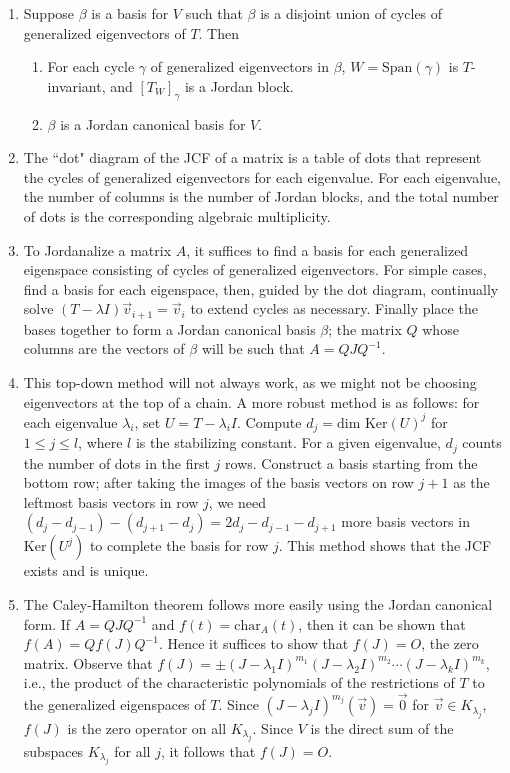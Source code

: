 \documentclass[10pt]{article}
\begin{document}
\begin{multicols*}{2}
\begin{enumerate}
\begin{enumerate}
        \item Suppose $\beta$ is a basis for $V$ such that $\beta$ is a disjoint union of cycles of generalized eigenvectors of $T$. Then
        \begin{enumerate}
            \item For each cycle $\gamma$ of generalized eigenvectors in $\beta$, $W=\text{Span}(\gamma)$ is $T$-invariant, and $[T_W]_\gamma$ is a Jordan block.
            \item $\beta$ is a Jordan canonical basis for $V$.
        \end{enumerate}
        \item The ``dot" diagram of the JCF of a matrix is a table of dots that represent the cycles of generalized eigenvectors for each eigenvalue. For each eigenvalue, the number of columns is the number of Jordan blocks, and the total number of dots is the corresponding algebraic multiplicity.
        \item To Jordanalize a matrix $A$, it suffices to find a basis for each generalized eigenspace consisting of cycles of generalized eigenvectors. For simple cases, find a basis for each eigenspace, then, guided by the dot diagram, continually solve $(T-\lambda I)\vec{v}_{i+1} = \vec{v}_i$ to extend cycles as necessary. Finally place the bases together to form a Jordan canonical basis $\beta$; the matrix $Q$ whose columns are the vectors of $\beta$ will be such that $A=QJQ^{-1}$. 
        \item This top-down method will not always work, as we might not be choosing eigenvectors at the top of a chain. A more robust method is as follows: for each eigenvalue $\lambda_i$, set $U=T-\lambda_i I$. Compute $d_j = \text{dim Ker}(U)^j$ for $1 \leq j \leq l$, where $l$ is the stabilizing constant. For a given eigenvalue, $d_j$ counts the number of dots in the first $j$ rows. Construct a basis starting from the bottom row; after taking the images of the basis vectors on row $j+1$ as the leftmost basis vectors in row $j$, we need $(d_j-d_{j-1}) - (d_{j+1}-d_{j}) = 2d_j-d_{j-1}-d_{j+1}$ more basis vectors in $\text{Ker}(U^j)$ to complete the basis for row $j$. This method shows that the JCF exists and is unique.
        \item The Caley-Hamilton theorem follows more easily using the Jordan canonical form. If $A=QJQ^{-1}$ and $f(t)=\text{char}_A(t)$, then it can be shown that $f(A)=Qf(J)Q^{-1}$. Hence it suffices to show that $f(J)=O$, the zero matrix. Observe that $f(J)=\pm(J-\lambda_1 I)^{m_1}(J-\lambda_2 I)^{m_2}\cdots(J-\lambda_k I)^{m_k}$, i.e., the product of the characteristic polynomials of the restrictions of $T$ to the generalized eigenspaces of $T$. Since $(J-\lambda_j I)^{m_j}(\vec{v})=\vec{0}$ for $\vec{v} \in K_{\lambda_j}$, $f(J)$ is the zero operator on all $K_{\lambda_j}$. Since $V$ is the direct sum of the subspaces $K_{\lambda_j}$ for all $j$, it follows that $f(J)=O$.
    \end{enumerate}
    

\end{enumerate}
\end{multicols*}
\end{document}
